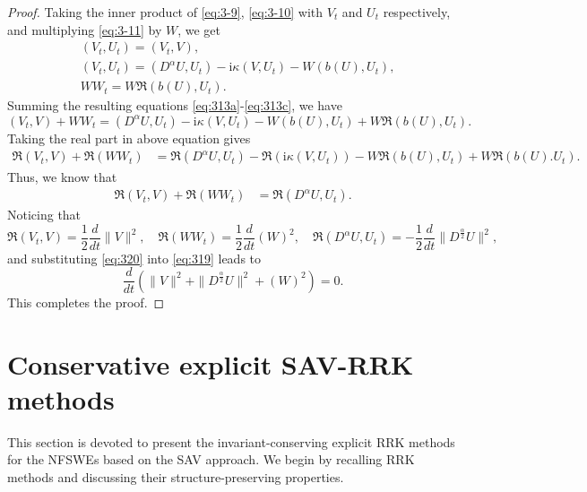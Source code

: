 \documentclass[preprint,compress,3p,10pt,fleqn]{elsarticle}
\numberwithin{equation}{section}
\begin{document}
\begin{proof}
	Taking the inner product of \eqref{eq:3-9}, \eqref{eq:3-10} with $V_t$ and $U_t$ respectively, and multiplying \eqref{eq:3-11} by $W$, we get
\begin{align}
&\left(V_t, U_t\right)=\left(V_t, V\right), \label{eq:313a}\\
&\left(V_t, U_t\right)=\left(D^{\alpha} U, U_t\right)-\mathrm{i} \kappa\left(V, U_t\right)-W\left(b(U), U_t\right), \label{eq:313b}\\
&W W_t=W\Re\left(b(U), U_t\right).\label{eq:313c}
\end{align}
Summing the resulting equations \eqref{eq:313a}-\eqref{eq:313c}, we have
\begin{equation}
\left(V_t, V\right) + W W_t= \left(D^{\alpha} U, U_t\right)-\mathrm{i} \kappa\left(V, U_t\right)-W\left(b(U), U_t\right) + W\Re\left(b(U), U_t\right).
\end{equation}
Taking the real part in above equation gives
\begin{align}
\Re\left(V_t, V\right) + \Re\left(W W_t\right)&= \Re\left(D^{\alpha} U, U_t\right)-\Re\left(\mathrm{i} \kappa\left(V, U_t\right)\right)-W\Re\left(b(U), U_t\right) + W\Re\left(b(U). U_t\right).
\end{align}
Thus, we know that
\begin{align}
\Re\left(V_t, V\right) + \Re\left(W W_t\right)&= \Re\left(D^{\alpha} U, U_t\right).\label{eq:319}
\end{align}
Noticing that
\begin{equation}
\Re\left(V_t, V\right) = \frac{1}{2}\frac{d }{d t}\|V\|^2, \quad \Re\left(W W_t\right) = \frac{1}{2}\frac{d }{d t}\left(W\right)^2,\quad \Re\left(D^{\alpha} U, U_t\right)=-\frac{1}{2}\frac{d }{d t}\|D^\frac{\alpha}{2}U\|^2,\label{eq:320}
\end{equation}
and substituting \eqref{eq:320} into \eqref{eq:319} leads to
\begin{equation}
\frac{d }{d t}\left(\|V\|^2+\|D^\frac{\alpha}{2}U\|^2+\left(W\right)^2\right)=0.
\end{equation}
This completes the proof.
\end{proof}

\section{Conservative explicit SAV-RRK methods}\label{Section 4}
This section is devoted to present the invariant-conserving explicit RRK methods for the NFSWEs based on the SAV approach.
We begin by recalling RRK methods and discussing their structure-preserving properties.
\end{document}
